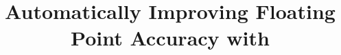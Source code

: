 \documentclass[pageno]{jpaper}
\begin{document}
\title{Automatically Improving Floating Point Accuracy with \casio}
\date{}
\maketitle
\thispagestyle{empty}





















\end{document}
